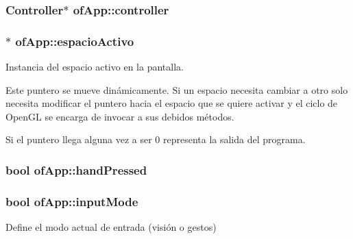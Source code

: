 \subsubsection[{controller}]{\setlength{\rightskip}{0pt plus 5cm}Controller$\ast$ of\+App\+::controller\hspace{0.3cm}{\ttfamily [private]}}\label{classof_app_aaca01b1fe9aa8a406ca09a5c4ede5f99}
\hypertarget{classof_app_a1e3e4e9da97b2a839dd1255c65f73453}{}
\subsubsection[{espacio\+Activo}]{$\ast$ of\+App\+::espacio\+Activo\hspace{0.3cm}{\ttfamily [private]}}\label{classof_app_a1e3e4e9da97b2a839dd1255c65f73453}


Instancia del espacio activo en la pantalla. 

Este puntero se mueve dinámicamente. Si un espacio necesita cambiar a otro solo necesita modificar el puntero hacia el espacio que se quiere activar y el ciclo de Open\+G\+L se encarga de invocar a sus debidos métodos.

Si el puntero llega alguna vez a ser 0 representa la salida del programa. \hypertarget{classof_app_acd3a56a2f96cc74a240b84649179e79f}{}
\subsubsection[{hand\+Pressed}]{\setlength{\rightskip}{0pt plus 5cm}bool of\+App\+::hand\+Pressed\hspace{0.3cm}{\ttfamily [private]}}\label{classof_app_acd3a56a2f96cc74a240b84649179e79f}
\hypertarget{classof_app_ac06e7f62949f8d76a68ea3020ff21da3}{}
\subsubsection[{input\+Mode}]{\setlength{\rightskip}{0pt plus 5cm}bool of\+App\+::input\+Mode}\label{classof_app_ac06e7f62949f8d76a68ea3020ff21da3}


Define el modo actual de entrada (visión o gestos) 

